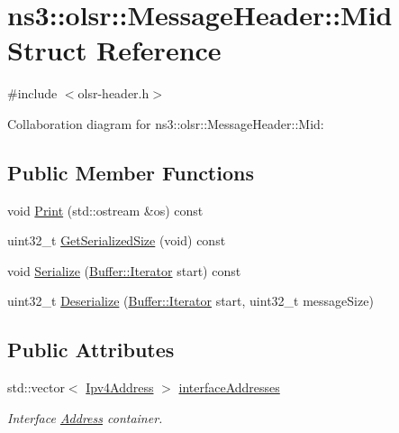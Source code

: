 \hypertarget{structns3_1_1olsr_1_1MessageHeader_1_1Mid}{}\section{ns3\+:\+:olsr\+:\+:Message\+Header\+:\+:Mid Struct Reference}
\label{structns3_1_1olsr_1_1MessageHeader_1_1Mid}


{\ttfamily \#include $<$olsr-\/header.\+h$>$}



Collaboration diagram for ns3\+:\+:olsr\+:\+:Message\+Header\+:\+:Mid\+:
\subsection*{Public Member Functions}
\begin{DoxyCompactItemize}
\item 
void \hyperlink{structns3_1_1olsr_1_1MessageHeader_1_1Mid_a9c1c45246bf52f930c948d686a3d3ea4}{Print} (std\+::ostream \&os) const 
\item 
uint32\+\_\+t \hyperlink{structns3_1_1olsr_1_1MessageHeader_1_1Mid_ab70aab8fd068a394e6688f534cc1499c}{Get\+Serialized\+Size} (void) const 
\item 
void \hyperlink{structns3_1_1olsr_1_1MessageHeader_1_1Mid_a06cabc96f3b838fa14608ce4d481a732}{Serialize} (\hyperlink{classns3_1_1Buffer_1_1Iterator}{Buffer\+::\+Iterator} start) const 
\item 
uint32\+\_\+t \hyperlink{structns3_1_1olsr_1_1MessageHeader_1_1Mid_aedc7c6336a7552477f77c3ade8f68b5c}{Deserialize} (\hyperlink{classns3_1_1Buffer_1_1Iterator}{Buffer\+::\+Iterator} start, uint32\+\_\+t message\+Size)
\end{DoxyCompactItemize}
\subsection*{Public Attributes}
\begin{DoxyCompactItemize}
\item 
std\+::vector$<$ \hyperlink{classns3_1_1Ipv4Address}{Ipv4\+Address} $>$ \hyperlink{structns3_1_1olsr_1_1MessageHeader_1_1Mid_a44009554c4ed0aeb139f7273d42abc68}{interface\+Addresses}
\begin{DoxyCompactList}\small\item\em Interface \hyperlink{classns3_1_1Address}{Address} container. \end{DoxyCompactList}\end{DoxyCompactItemize}


